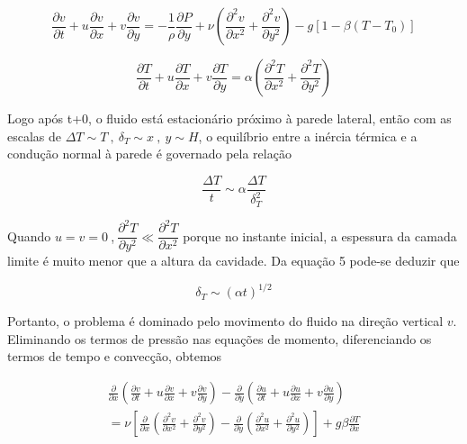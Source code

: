 \documentclass[12pt]{article}
\begin{document}
\begin{equation}
	\frac{\partial v}{\partial t} + u \frac{\partial v}{\partial x} + v \frac{\partial v}{\partial y} = -\frac{1}{\rho} \frac{\partial P}{\partial y} + \nu \left( \frac{\partial^2 v}{\partial x^2} + \frac{\partial^2 v}{\partial y^2} \right) - g \left[ 1 - \beta (T - T_0) \right]
\end{equation}

\begin{equation}
	\frac{\partial T}{\partial t} + u \frac{\partial T}{\partial x} + v \frac{\partial T}{\partial y} = \alpha \left( \frac{\partial^2 T}{\partial x^2} + \frac{\partial^2 T}{\partial y^2} \right)
\end{equation}

Logo após t+0, o fluido está estacionário próximo à parede lateral, então com as escalas de $\Delta T \sim T \ , \ \delta_{T} \sim x \ , \ y \sim H $,  o equilíbrio entre a inércia térmica e a condução normal à parede é governado pela relação

\begin{equation}
	\frac{\Delta T}{t} \sim \alpha \frac{\Delta T}{\delta_T^2}
\end{equation}

Quando $u = v = 0 \ $,$ \ \dfrac{\partial^{2} T}{\partial y^{2}} \ll \dfrac{\partial^{2} T}{\partial x^{2}} $ porque no instante inicial, a espessura da camada limite é muito menor que a altura da cavidade. Da equação 5 pode-se deduzir que

\begin{equation}
	\delta_T \sim (\alpha t)^{1/2}
\end{equation}

Portanto, o problema é dominado pelo movimento do fluido na direção vertical $v$. Eliminando os termos de pressão nas equações de momento, diferenciando os termos de tempo e convecção, obtemos

\begin{align}
	\frac{\partial}{\partial x} \left( \frac{\partial v}{\partial t} + u \frac{\partial v}{\partial x} + v \frac{\partial v}{\partial y} \right) - \frac{\partial}{\partial y} \left( \frac{\partial u}{\partial t} + u \frac{\partial u}{\partial x} + v \frac{\partial u}{\partial y} \right) \\
	= \nu \left[ \frac{\partial}{\partial x} \left( \frac{\partial^2 v}{\partial x^2} + \frac{\partial^2 v}{\partial y^2} \right) - \frac{\partial}{\partial y} \left( \frac{\partial^2 u}{\partial x^2} + \frac{\partial^2 u}{\partial y^2} \right) \right] + g \beta \frac{\partial T}{\partial x}
\end{align}
\end{document}
